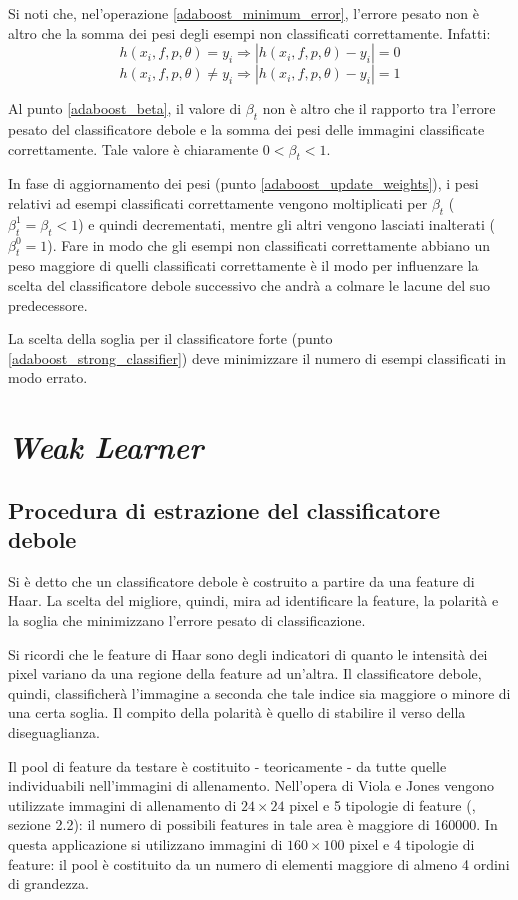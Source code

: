             Si noti che, nel'operazione \ref{adaboost_minimum_error}, l'errore pesato non è altro che la somma dei pesi degli esempi non classificati correttamente. Infatti:
            $$ h(x_i, f, p, \theta) = y_i \Rightarrow |h(x_i, f, p, \theta) - y_i| = 0 $$
            $$ h(x_i, f, p, \theta) \neq y_i \Rightarrow |h(x_i, f, p, \theta) - y_i| = 1 $$

            Al punto \ref{adaboost_beta}, il valore di $\beta_t$ non è altro che il rapporto tra l'errore pesato del classificatore debole e la somma dei pesi delle immagini classificate correttamente. Tale valore è chiaramente $0 < \beta_t < 1$.

            In fase di aggiornamento dei pesi (punto \ref{adaboost_update_weights}), i pesi relativi ad esempi classificati correttamente vengono moltiplicati per $\beta_t$ ($\beta_{t}^{1} = \beta_t < 1$) e quindi decrementati, mentre gli altri vengono lasciati inalterati ($\beta_{t}^{0} = 1$). Fare in modo che gli esempi non classificati correttamente abbiano un peso maggiore di quelli classificati correttamente è il modo per influenzare la scelta del classificatore debole successivo che andrà a colmare le lacune del suo predecessore.

            La scelta della soglia per il classificatore forte (punto \ref{adaboost_strong_classifier}) deve minimizzare il numero di esempi classificati in modo errato.
    \section{\emph{Weak Learner}}
    \label{sec:weak_learner}
        \subsection{Procedura di estrazione del classificatore debole}
            Si è detto che un classificatore debole è costruito a partire da una feature di Haar. La scelta del migliore, quindi, mira ad identificare la feature, la polarità e la soglia che minimizzano l'errore pesato di classificazione.

            Si ricordi che le feature di Haar sono degli indicatori di quanto le intensità dei pixel variano da una regione della feature ad un'altra. Il classificatore debole, quindi, classificherà l'immagine a seconda che tale indice sia maggiore o minore di una certa soglia. Il compito della polarità è quello di stabilire il verso della diseguaglianza.

            Il pool di feature da testare è costituito - teoricamente - da tutte quelle individuabili nell'immagini di allenamento. Nell'opera di Viola e Jones vengono utilizzate immagini di allenamento di $24 \times 24$ pixel e 5 tipologie di feature (\cite{Viola04}, sezione 2.2): il numero di possibili features in tale area è maggiore di 160000. In questa applicazione si utilizzano immagini di $160 \times 100$ pixel e 4 tipologie di feature: il pool è costituito da un numero di elementi maggiore di almeno 4 ordini di grandezza.

